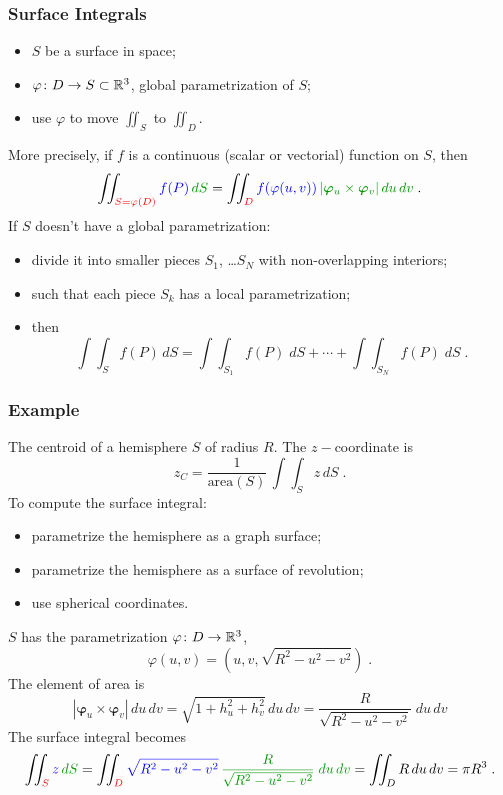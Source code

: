 \begin{frame}
  \frametitle{Surface Integrals}

\begin{itemize}
  \item $S$ be a surface in space;
  \item $\varphi \colon D \to S \subset {\mathbb{R}}^3$, global parametrization of $S$;
  \item use $\varphi$ to move $\iint_S$ to $\iint_D$.
\end{itemize}

\pause
More precisely, if $f$ is a continuous (scalar or vectorial) function on $S$, then
%
$$\int\!\!\!\int_{\textcolor[rgb]{0.98,0.00,0.00}{S=\varphi(D)}} \textcolor[rgb]{0.00,0.00,1.00}{f(P)} \, \textcolor[rgb]{0.00,0.59,0.00}{dS} = \int\!\!\!\int_{\textcolor[rgb]{0.98,0.00,0.00}{D}} \textcolor[rgb]{0.00,0.00,1.00}{f(\varphi(u,v))}\, \textcolor[rgb]{0.00,0.59,0.00}{| \bm{\varphi}_u \times \bm{\varphi}_v| \, du\, dv}\; .$$
%
\pause If $S$ doesn't have a global parametrization:
\begin{itemize}
  \item \pause divide it into smaller pieces $S_1$, \ldots $S_N$ with non-overlapping interiors;
  \item such that each piece  $S_k$ has a local parametrization;
  \item then
%
$$\int\!\!\!\int_{S} f(P)\, dS = \int\!\!\!\int_{S_1} f(P)\; dS + \dotsb + \int\!\!\!\int_{S_N} f(P)\; dS\; .$$
\end{itemize}
\end{frame}

\begin{frame}
  \frametitle{Example}

The centroid of a hemisphere $S$ of radius $R$. \pause The $z-$coordinate is
%
$$z_C = \frac{1}{\text{area}(S)}\, \int\!\!\!\int_S z \, dS\; .$$
%
\pause To compute the surface integral:
 \begin{itemize}
   \item \pause parametrize the hemisphere as a graph surface;
   \item \pause parametrize the hemisphere as a surface of revolution;
   \item \pause use spherical coordinates.
 \end{itemize}

\pause $S$ has the parametrization $\varphi \colon D \to {\mathbb{R}}^3$,
%
$$\varphi(u,v) = (u,v,\sqrt{R^2-u^2-v^2}) \; .$$
%
\pause The element of area is
%
$$|\bm{\varphi}_u \times \bm{\varphi}_v| \, du\, dv = \sqrt{1+h_u^2+h_v^2} \, du\, dv = \frac{R}{\sqrt{R^2-u^2-v^2}} \; du\, dv$$
%
\pause The surface integral becomes
%
$$\int\!\!\!\int_{\textcolor[rgb]{0.98,0.00,0.00}{S}} \textcolor[rgb]{0.00,0.00,1.00}{z} \, \textcolor[rgb]{0.00,0.59,0.00}{dS} = \int\!\!\!\int_{\textcolor[rgb]{0.98,0.00,0.00}{D}} \textcolor[rgb]{0.00,0.00,1.00}{\sqrt{R^2-u^2-v^2}}\, \textcolor[rgb]{0.00,0.59,0.00}{\frac{R}{\sqrt{R^2-u^2-v^2}} \; du\, dv} = \int\!\!\!\int_D R\, du\, dv = \pi R^3 \; .$$
\end{frame}

